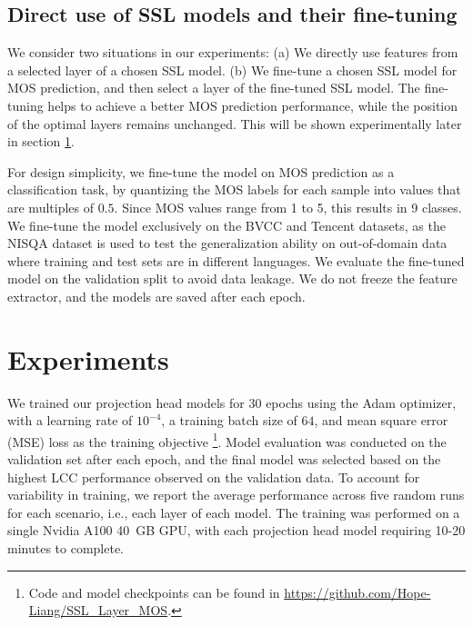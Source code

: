 \documentclass[conference]{IEEEtran}
\begin{document}
\subsection{Direct use of SSL models and their fine-tuning}
\label{sec:fine-tune}

We consider two situations in our experiments: (a) We directly use features from a selected layer of a chosen SSL model. (b) We fine-tune a chosen SSL model for MOS prediction, and then select a layer of the fine-tuned SSL model. The fine-tuning helps to achieve a better MOS prediction performance, while the position of the optimal layers remains unchanged. This will be shown experimentally later in section \ref{sec:experiments}.

For design simplicity, we fine-tune the model on MOS prediction as a classification task, by quantizing the MOS labels for each sample into values that are multiples of $0.5$. Since MOS values range from 1 to 5, this results in 9 classes. We fine-tune the model exclusively on the BVCC and Tencent datasets, as the NISQA dataset is used to test the generalization ability on out-of-domain data where training and test sets are in different languages. We evaluate the fine-tuned model on the validation split to avoid data leakage. We do not freeze the feature extractor, and the models are saved after each epoch.


\section{Experiments}
\label{sec:experiments}

We trained our projection head models for $30$ epochs using the Adam \cite{Adam} optimizer, with a learning rate of $10^{-4}$, a training batch size of $64$, and mean square error (MSE) loss as the training objective \footnote{Code and model checkpoints can be found in \url{https://github.com/Hope-Liang/SSL_Layer_MOS}.}. Model evaluation was conducted on the validation set after each epoch, and the final model was selected based on the highest LCC performance observed on the validation data. To account for variability in training, we report the average performance across five random runs for each scenario, i.e., each layer of each model. The training was performed on a single Nvidia A100 40~GB GPU, with each projection head model requiring 10-20 minutes to complete.
\end{document}
